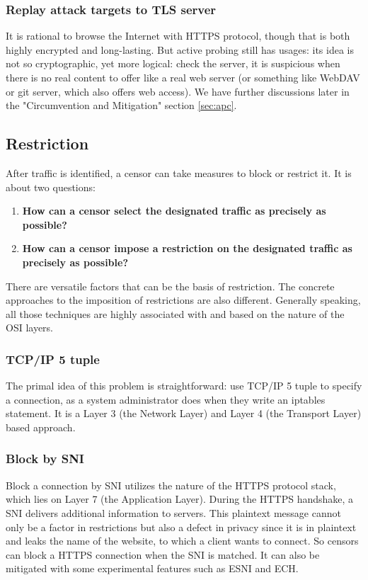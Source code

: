 \documentclass[conference]{IEEEtran}
\begin{document}
\subsubsection{Replay attack targets to TLS server}
It is rational to browse the Internet with HTTPS protocol, though that is both highly encrypted and long-lasting. But active probing still has usages: its idea is not so cryptographic, yet more logical: check the server, it is suspicious when there is no real content to offer like a real web server (or something like WebDAV or git server, which also offers web access).
We have further discussions later in the "Circumvention and Mitigation" section \ref{sec:apc}.

\subsection{Restriction}
After traffic is identified, a censor can take measures to block or restrict it.
It is about two questions:
\begin{enumerate}
    \item \textbf{How can a censor select the designated traffic as precisely as possible?}
    \item \textbf{How can a censor impose a restriction on the designated traffic as precisely as possible?}
\end{enumerate}
There are versatile factors that can be the basis of restriction. The concrete approaches to the imposition of restrictions are also different. Generally speaking, all those techniques are highly associated with and based on the nature of the OSI layers.

\subsubsection{TCP/IP 5 tuple}
The primal idea of this problem is straightforward: use TCP/IP 5 tuple to specify a connection, as a system administrator does when they write an iptables statement. It is a Layer 3 (the Network Layer) and Layer 4 (the Transport Layer) based approach.

\subsubsection{Block by SNI}
Block a connection by SNI utilizes the nature of the HTTPS protocol stack, which lies on Layer 7 (the Application Layer). During the HTTPS handshake, a SNI delivers additional information to servers. This plaintext message cannot only be a factor in restrictions but also a defect in privacy since it is in plaintext and leaks the name of the website, to which a client wants to connect. So censors can block a HTTPS connection when the SNI is matched.
It can also be mitigated with some experimental features such as ESNI and ECH.
\end{document}
